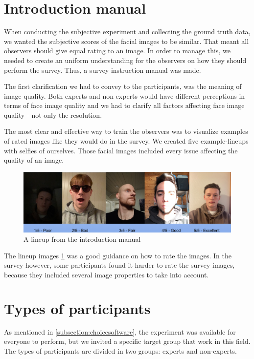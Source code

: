 \section{Introduction manual}
\label{sec:intromanual}
When conducting the subjective experiment and collecting the ground truth data, we wanted the subjective scores of the facial images to be similar. That meant all observers should give equal rating to an image. In order to manage this, we needed to create an uniform understanding for the observers on how they should perform the survey. Thus, a survey instruction manual was made. 

The first clarification we had to convey to the participants, was the meaning of image quality. Both experts and non experts would have different perceptions in terms of face image quality and we had to clarify all factors affecting face image quality - not only the resolution. 

The most clear and effective way to train the observers was to visualize examples of rated images like they would do in the survey. We created five example-lineups with selfies of ourselves. Those facial images included every issue affecting the quality of an image. 

\begin{figure}[h]
    \centering
    \includegraphics[scale = 0.23]{figures/Example-lineup.png}
    \caption{A lineup from the introduction manual}
    \label{fig:example-manual}
\end{figure}

The lineup images \ref{fig:example-manual} was a good guidance on how to rate the images. In the survey however, some participants found it harder to rate the survey images, because they included several image properties to take into account. 

\section{Types of participants}
As mentioned in \ref{subsection:choicesoftware}, the experiment was available for everyone to perform, but we invited a specific target group that work in this field. The types of participants are divided in two groups: experts and non-experts.

